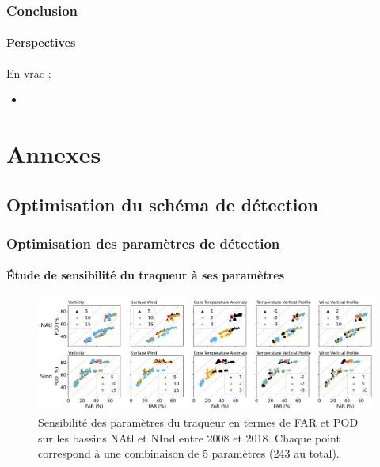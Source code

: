 \documentclass[aspectratio=169, usepdftitle=false, xcolor={dvipsnames}, 9pt,table]{beamer}
\begin{document}
\begin{frame}[c]
\end{frame}

\begin{frame}[t]
    \frametitle{Conclusion}
    \framesubtitle{Perspectives}
    En vrac :
    \begin{itemize}
        \item 
    \end{itemize}
\end{frame}

\makethankyouslide

%

\appendix
\section*{Annexes}
\subsection*{Optimisation du schéma de détection}

\begin{frame}[c]
    \frametitle{Optimisation des paramètres de détection}
    \framesubtitle{Étude de sensibilité du traqueur à ses paramètres}
    \begin{figure}
        \centering
        \includegraphics[width=\textwidth]{Figures/optimisation_vectors.png}
        \caption{\small Sensibilité des paramètres du traqueur en termes de FAR et POD sur les bassins NAtl et NInd entre 2008 et 2018. Chaque point correspond
        à une combinaison de 5 paramètres (243 au total).}
    \end{figure}
\end{frame}
\end{document}
